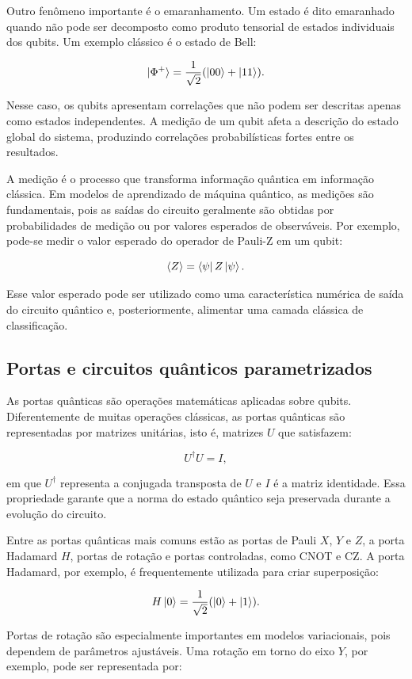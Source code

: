\documentclass[
    12pt,
    openright,
    oneside,
    a4paper,
    english,
    brazil
]{abntex2}
\begin{document}
Outro fenômeno importante é o emaranhamento. Um estado é dito emaranhado quando não pode ser decomposto como produto tensorial de estados individuais dos qubits. Um exemplo clássico é o estado de Bell:

\[
\ket{\Phi^+} =
\frac{1}{\sqrt{2}}
(\ket{00} + \ket{11}).
\]

Nesse caso, os qubits apresentam correlações que não podem ser descritas apenas como estados independentes. A medição de um qubit afeta a descrição do estado global do sistema, produzindo correlações probabilísticas fortes entre os resultados.

A medição é o processo que transforma informação quântica em informação clássica. Em modelos de aprendizado de máquina quântico, as medições são fundamentais, pois as saídas do circuito geralmente são obtidas por probabilidades de medição ou por valores esperados de observáveis. Por exemplo, pode-se medir o valor esperado do operador de Pauli-Z em um qubit:

\[
\langle Z \rangle =
\bra{\psi} Z \ket{\psi}.
\]

Esse valor esperado pode ser utilizado como uma característica numérica de saída do circuito quântico e, posteriormente, alimentar uma camada clássica de classificação.

\subsection{Portas e circuitos quânticos parametrizados}

As portas quânticas são operações matemáticas aplicadas sobre qubits. Diferentemente de muitas operações clássicas, as portas quânticas são representadas por matrizes unitárias, isto é, matrizes \(U\) que satisfazem:

\[
U^\dagger U = I,
\]

em que \(U^\dagger\) representa a conjugada transposta de \(U\) e \(I\) é a matriz identidade. Essa propriedade garante que a norma do estado quântico seja preservada durante a evolução do circuito.

Entre as portas quânticas mais comuns estão as portas de Pauli \(X\), \(Y\) e \(Z\), a porta Hadamard \(H\), portas de rotação e portas controladas, como CNOT e CZ. A porta Hadamard, por exemplo, é frequentemente utilizada para criar superposição:

\[
H\ket{0} =
\frac{1}{\sqrt{2}}
(\ket{0} + \ket{1}).
\]

Portas de rotação são especialmente importantes em modelos variacionais, pois dependem de parâmetros ajustáveis. Uma rotação em torno do eixo \(Y\), por exemplo, pode ser representada por:
\end{document}
